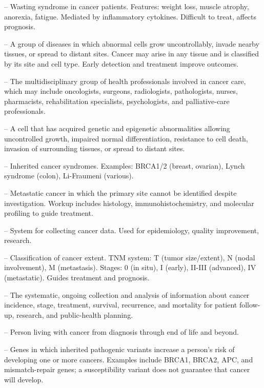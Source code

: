 -- Wasting syndrome in cancer patients. Features: weight loss, muscle atrophy, anorexia, fatigue. Mediated by inflammatory cytokines. Difficult to treat, affects prognosis.

-- A group of diseases in which abnormal cells grow uncontrollably, invade nearby tissues, or spread to distant sites. Cancer may arise in any tissue and is classified by its site and cell type. Early detection and treatment improve outcomes.

-- The multidisciplinary group of health professionals involved in cancer care, which may include oncologists, surgeons, radiologists, pathologists, nurses, pharmacists, rehabilitation specialists, psychologists, and palliative-care professionals.

-- A cell that has acquired genetic and epigenetic abnormalities allowing uncontrolled growth, impaired normal differentiation, resistance to cell death, invasion of surrounding tissues, or spread to distant sites.

-- Inherited cancer syndromes. Examples: BRCA1/2 (breast, ovarian), Lynch syndrome (colon), Li-Fraumeni (various).

-- Metastatic cancer in which the primary site cannot be identified despite investigation. Workup includes histology, immunohistochemistry, and molecular profiling to guide treatment.

-- System for collecting cancer data. Used for epidemiology, quality improvement, research.

-- Classification of cancer extent. TNM system: T (tumor size/extent), N (nodal involvement), M (metastasis). Stages: 0 (in situ), I (early), II-III (advanced), IV (metastatic). Guides treatment and prognosis.

-- The systematic, ongoing collection and analysis of information about cancer incidence, stage, treatment, survival, recurrence, and mortality for patient follow-up, research, and public-health planning.

-- Person living with cancer from diagnosis through end of life and beyond.

-- Genes in which inherited pathogenic variants increase a person’s risk of developing one or more cancers. Examples include BRCA1, BRCA2, APC, and mismatch-repair genes; a susceptibility variant does not guarantee that cancer will develop.

